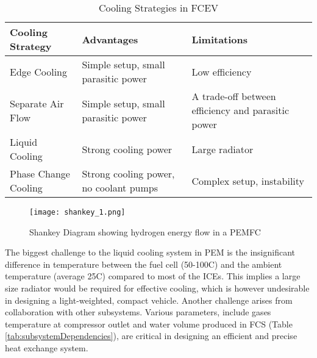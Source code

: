 \documentclass[a4paper,11pt]{article}
\begin{document}
\begin{table}[h!]
    \centering
    \begin{tabular}{|p{}|p{}||p{}|} %
    \hline
    Cooling Strategy & Advantages & Limitations \\ [0.5ex] 
    \hline\hline
    Edge Cooling & Simple setup, small parasitic power & Low efficiency \\
    \hline
    Separate Air Flow & Simple setup, small parasitic power & A trade-off between efficiency and parasitic power \\
    \hline
    Liquid Cooling & Strong cooling power & Large radiator \\
    \hline
    Phase Change Cooling & Strong cooling power, no coolant pumps & Complex setup, instability \\
    \hline
    \end{tabular}
    \caption{Cooling Strategies in FCEV}
    \label{tab:coolingStrats}
\end{table}

\begin{figure}[h]
    \texttt{[image: shankey\_1.png]}
    \caption{Shankey Diagram showing hydrogen energy flow in a PEMFC\cite{nguyen2020proton}}
    \centering
    \label{fig:sangkyEnergy}  
\end{figure}

The biggest challenge to the liquid cooling system in PEM is the insignificant difference in temperature between the fuel cell (50-100\degree C) and the ambient temperature (average 25\degree C) compared to most of the ICEs\cite{islamnanofluid}. This implies a large size radiator would be required for effective cooling, which is however undesirable in designing a light-weighted, compact vehicle. Another challenge arises from collaboration with other subsystems. Various parameters, include gases temperature at compressor outlet and water volume produced in FCS (Table \ref{tab:subsystemDependencies}), are critical in designing an efficient and precise heat exchange system.
\end{document}
